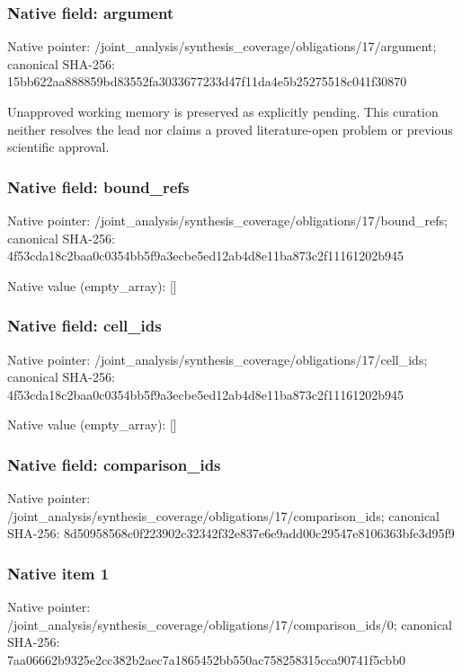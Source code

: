 \documentclass[10pt,a4paper]{article}
\begin{document}
\subsubsection{Native field: argument}
Native pointer: /joint\_\allowbreak{}analysis/synthesis\_\allowbreak{}coverage/obligations/17/argument; canonical SHA-256: 15bb622aa888859bd83552fa3033677233d47f11da4e5b25275518c041f30870

\begingroup\raggedright\sloppy Unapproved working memory is preserved as explicitly pending. This curation neither resolves the lead nor claims a proved literature-open problem or previous scientific approval.\par\endgroup

\subsubsection{Native field: bound\_\allowbreak{}refs}
Native pointer: /joint\_\allowbreak{}analysis/synthesis\_\allowbreak{}coverage/obligations/17/bound\_\allowbreak{}refs; canonical SHA-256: 4f53cda18c2baa0c0354bb5f9a3ecbe5ed12ab4d8e11ba873c2f11161202b945

Native value (empty\_\allowbreak{}array): []

\subsubsection{Native field: cell\_\allowbreak{}ids}
Native pointer: /joint\_\allowbreak{}analysis/synthesis\_\allowbreak{}coverage/obligations/17/cell\_\allowbreak{}ids; canonical SHA-256: 4f53cda18c2baa0c0354bb5f9a3ecbe5ed12ab4d8e11ba873c2f11161202b945

Native value (empty\_\allowbreak{}array): []

\subsubsection{Native field: comparison\_\allowbreak{}ids}
Native pointer: /joint\_\allowbreak{}analysis/synthesis\_\allowbreak{}coverage/obligations/17/comparison\_\allowbreak{}ids; canonical SHA-256: 8d50958568c0f223902c32342f32e837e6e9add00c29547e8106363bfe3d95f9

\subsubsection{Native item 1}
Native pointer: /joint\_\allowbreak{}analysis/synthesis\_\allowbreak{}coverage/obligations/17/comparison\_\allowbreak{}ids/0; canonical SHA-256: 7aa06662b9325e2cc382b2aec7a1865452bb550ac758258315cca90741f5cbb0
\end{document}
